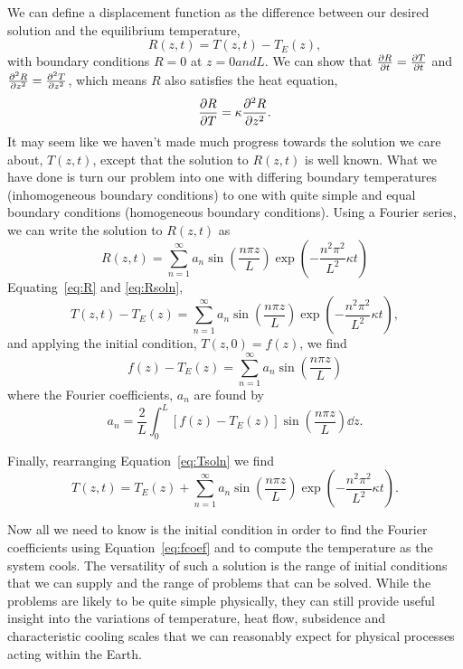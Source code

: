 We can define a displacement function as the difference between our desired solution and the equilibrium temperature,
\begin{equation}
    R(z,t) = T(z,t) - T_E(z) ,
    \label{eq:R}
\end{equation}
with boundary conditions $R = 0$ at $z = 0 and L$.  We can show that $\pdv{R}{t}
= \pdv{T}{t}$ and $\pdv[2]{R}{z} = \pdv[2]{T}{z}$, which means $R$ also satisfies
the heat equation,
\begin{equation}
    \pdv{R}{T} = \kappa \pdv[2]{R}{z} .
\end{equation}
It may seem like we haven't made much progress towards the solution we care about, $T(z,t)$, except that the solution to $R(z,t)$ is well known.  What we have done is turn our problem into one with differing boundary temperatures (inhomogeneous boundary conditions) to one with quite simple and equal boundary conditions (homogeneous boundary conditions).  Using a Fourier series, we can write the solution to $R(z,t)$ as
\begin{equation}
    R(z,t) = \sum_{n=1}^{\infty} a_n \sin \left( \frac{n \pi z}{L} \right)
    \exp \left( -\frac{ n^2 \pi^2 }{L^2} \kappa t \right)
    \label{eq:Rsoln}
\end{equation}
Equating~\ref{eq:R} and \ref{eq:Rsoln},
\begin{equation}
    T(z,t) - T_E(z) = \sum_{n=1}^{\infty} a_n \sin \left( \frac{n \pi z}{L} \right)
    \exp \left( -\frac{ n^2 \pi^2 }{L^2} \kappa t \right) ,
    \label{eq:Tsoln}
\end{equation}
and applying the initial condition, $T(z,0) = f(z)$, we find
\begin{equation*}
    f(z) - T_E(z) = \sum_{n=1}^{\infty} a_n \sin \left( \frac{n \pi z}{L} \right)
\end{equation*}
where the Fourier coefficients, $a_n$ are found by
\begin{equation}
    a_n = \frac{2}{L} \int_0^L [f(z) - T_E(z)] \sin \left( \frac{n \pi z}{L}
    \right) \dd{z} .
    \label{eq:fcoef}
\end{equation}

Finally, rearranging Equation~\ref{eq:Tsoln} we find
\begin{equation}
    T(z,t) =  T_E(z) + \sum_{n=1}^{\infty} a_n \sin \left( \frac{n \pi z}{L} \right)
    \exp \left( -\frac{ n^2 \pi^2 }{L^2} \kappa t \right) .
\end{equation}

Now all we need to know is the initial condition in order to find the Fourier coefficients using Equation~\ref{eq:fcoef} and to compute the temperature as the system cools.  The versatility of such a solution is the range of initial conditions that we can supply and the range of problems that can be solved.  While the problems are likely to be quite simple physically, they can still provide useful insight into the variations of temperature, heat flow, subsidence and characteristic cooling scales that we can reasonably expect for physical processes acting within the Earth.

